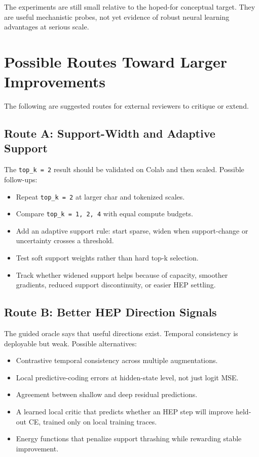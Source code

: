 \documentclass[11pt]{article}
\begin{document}
The experiments are still small relative to the hoped-for conceptual target.
They are useful mechanistic probes, not yet evidence of robust neural learning
advantages at serious scale.

\section{Possible Routes Toward Larger Improvements}

The following are suggested routes for external reviewers to critique or
extend.

\subsection{Route A: Support-Width and Adaptive Support}

The \texttt{top\_k = 2} result should be validated on Colab and then scaled.
Possible follow-ups:

\begin{itemize}
  \item Repeat \texttt{top\_k = 2} at larger char and tokenized scales.
  \item Compare \texttt{top\_k = 1, 2, 4} with equal compute budgets.
  \item Add an adaptive support rule: start sparse, widen when support-change
  or uncertainty crosses a threshold.
  \item Test soft support weights rather than hard top-k selection.
  \item Track whether widened support helps because of capacity, smoother
  gradients, reduced support discontinuity, or easier HEP settling.
\end{itemize}

\subsection{Route B: Better HEP Direction Signals}

The guided oracle says that useful directions exist. Temporal consistency is
deployable but weak. Possible alternatives:

\begin{itemize}
  \item Contrastive temporal consistency across multiple augmentations.
  \item Local predictive-coding errors at hidden-state level, not just logit
  MSE.
  \item Agreement between shallow and deep residual predictions.
  \item A learned local critic that predicts whether an HEP step will improve
  held-out CE, trained only on local training traces.
  \item Energy functions that penalize support thrashing while rewarding
  stable improvement.
\end{itemize}
\end{document}
